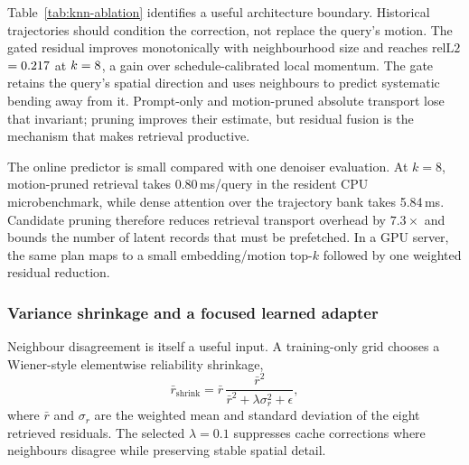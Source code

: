 \documentclass[11pt,a4paper]{article}
\newcommand{\relltwo}{\ensuremath{\mathrm{relL2}}}
\begin{document}
\begin{table}[ht]
\centering
\small

\caption{Five-fold held-out retrieval architecture ablation across scheduler
steps and horizons $1,2,4,8$. Positive change means lower error than calibrated
local momentum. Direct-move rows test neighbour copying; gated residual rows
use Equation~\ref{eq:retrieval-residual}. Lower is better.}
\label{tab:knn-ablation}
\end{table}

Table~\ref{tab:knn-ablation} identifies a useful architecture boundary.
Historical trajectories should condition the correction, not replace the
query's motion. The gated residual improves monotonically with neighbourhood
size and reaches \relltwo{} $=0.217$ at $k=8$,
a \RetrievalBestGain{} gain over schedule-calibrated local momentum. The gate
retains the query's spatial direction and uses neighbours to predict systematic
bending away from it. Prompt-only and motion-pruned absolute transport lose
that invariant; pruning improves their estimate, but residual fusion is the
mechanism that makes retrieval productive.

\begin{table}[ht]
\centering
\small

\caption{Resident-cache single-query predictor overhead on CPU with one
PyTorch thread (median of 30 repeats). The bank contains 199 trajectories;
model inference, storage I/O, and VAE decode are excluded. Lower is better.}
\label{tab:knn-timing}
\end{table}

The online predictor is small compared with one denoiser evaluation. At $k=8$,
motion-pruned retrieval takes 0.80\,ms/query in the resident CPU microbenchmark,
while dense attention over the trajectory bank takes 5.84\,ms. Candidate
pruning therefore reduces retrieval transport overhead by $7.3\times$ and
bounds the number of latent records that must be prefetched. In a GPU server,
the same plan maps to a small embedding/motion top-$k$ followed by one weighted
residual reduction.

\subsubsection{Variance shrinkage and a focused learned adapter}

Neighbour disagreement is itself a useful input. A training-only grid chooses a
Wiener-style elementwise reliability shrinkage,
\begin{equation}
  \bar r_{\mathrm{shrink}} = \bar r\,
  \frac{\bar r^2}{\bar r^2+\lambda\sigma_r^2+\epsilon},
\end{equation}
where $\bar r$ and $\sigma_r$ are the weighted mean and standard deviation of
the eight retrieved residuals. The selected $\lambda=0.1$ suppresses cache
corrections where neighbours disagree while preserving stable spatial detail.
\end{document}
